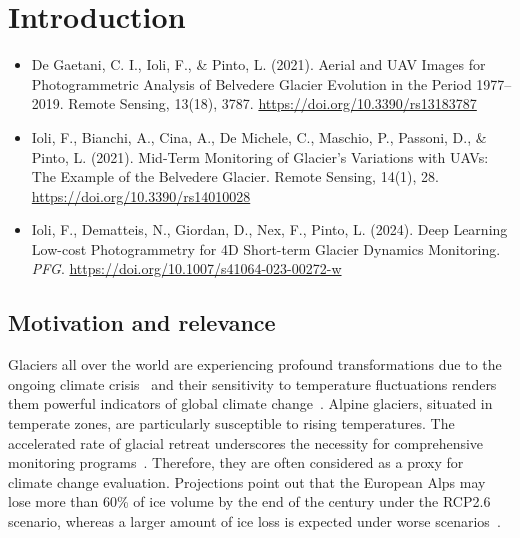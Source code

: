 \graphicspath{{figures/chapter1/}}
\onehalfspacing

\chapter{Introduction}\label{ch:introduction}

\vfill


\noindent 

\begin{itemize}
    \item De Gaetani, C. I., Ioli, F., \& Pinto, L. (2021). Aerial and UAV Images for Photogrammetric Analysis of Belvedere Glacier Evolution in the Period 1977–2019. Remote Sensing, 13(18), 3787. \url{https://doi.org/10.3390/rs13183787}
    \item Ioli, F., Bianchi, A., Cina, A., De Michele, C., Maschio, P., Passoni, D., \& Pinto, L. (2021). Mid-Term Monitoring of Glacier’s Variations with UAVs: The Example of the Belvedere Glacier. Remote Sensing, 14(1), 28. \url{https://doi.org/10.3390/rs14010028}
    \item Ioli, F., Dematteis, N., Giordan, D., Nex, F., Pinto, L. (2024). Deep Learning Low-cost Photogrammetry for 4D Short-term Glacier Dynamics Monitoring. \textit{PFG}. \url{https://doi.org/10.1007/s41064-023-00272-w}
\end{itemize}

\newpage

\section{Motivation and relevance}

Glaciers all over the world are experiencing profound transformations due to the ongoing climate crisis~\citep{Oerlemans2005} and their sensitivity to temperature fluctuations renders them powerful indicators of global climate change~\citep{Barry2006}.
Alpine glaciers, situated in temperate zones, are particularly susceptible to rising temperatures. The accelerated rate of glacial retreat underscores the necessity for comprehensive monitoring programs~\citep{Zemp2006,Sommer2020}. 
Therefore, they are often considered as a proxy for climate change evaluation.
Projections point out that the European Alps may lose more than 60\% of ice volume by the end of the century under the RCP2.6 scenario, whereas a larger amount of ice loss is expected under worse scenarios~\citep{Zekollari2019}.

